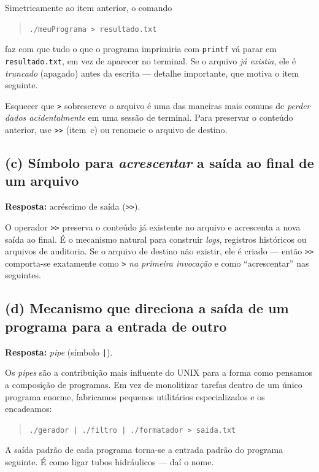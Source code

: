 \documentclass[11pt,a4paper]{article}
\begin{document}
Simetricamente ao item anterior, o comando
\begin{quote}\texttt{./meuPrograma > resultado.txt}\end{quote}
faz com que tudo o que o programa imprimiria com \texttt{printf} v\'a parar em \texttt{resultado.txt}, em vez de aparecer no terminal. Se o arquivo \emph{j\'a existia}, ele \'e \emph{truncado} (apagado) antes da escrita --- detalhe importante, que motiva o item seguinte.

\begin{errocomum}
Esquecer que \texttt{>} sobrescreve o arquivo \'e uma das maneiras mais comuns de \emph{perder dados acidentalmente} em uma sess\~ao de terminal. Para preservar o conte\'udo anterior, use \texttt{>>} (item~c) ou renomeie o arquivo de destino.
\end{errocomum}

\subsection*{(c) S\'imbolo para \emph{acrescentar} a sa\'ida ao final de um arquivo}

\begin{resposta}\textbf{Resposta:} acr\'escimo de sa\'ida (\texttt{>>}).\end{resposta}

O operador \texttt{>>} preserva o conte\'udo j\'a existente no arquivo e acrescenta a nova sa\'ida ao final. \'E o mecanismo natural para construir \emph{logs}, registros hist\'oricos ou arquivos de auditoria. Se o arquivo de destino n\~ao existir, ele \'e criado --- ent\~ao \texttt{>>} comporta-se exatamente como \texttt{>} \emph{na primeira invoca\c{c}\~ao} e como ``acrescentar'' nas seguintes.

\subsection*{(d) Mecanismo que direciona a sa\'ida de um programa para a entrada de outro}

\begin{resposta}\textbf{Resposta:} \emph{pipe} (s\'imbolo \texttt{|}).\end{resposta}

Os \emph{pipes} s\~ao a contribui\c{c}\~ao mais influente do UNIX para a forma como pensamos a composi\c{c}\~ao de programas. Em vez de monolitizar tarefas dentro de um \'unico programa enorme, fabricamos pequenos utilit\'arios especializados e os encadeamos:
\begin{quote}\texttt{./gerador | ./filtro | ./formatador > saida.txt}\end{quote}
A sa\'ida padr\~ao de cada programa torna-se a entrada padr\~ao do programa seguinte. \'E como ligar tubos hidr\'aulicos --- da\'i o nome.
\end{document}

